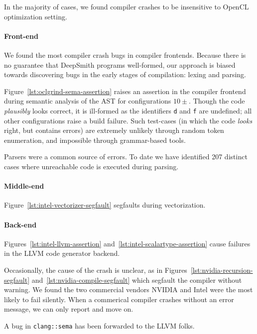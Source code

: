 In the majority of cases, we found compiler crashes to be insensitive to OpenCL optimization setting.

\paragraph{Front-end} We found the most compiler crash bugs in compiler frontends. Because there is no guarantee that DeepSmith programs well-formed, our approach is biased towards discovering bugs in the early stages of compilation: lexing and parsing.

Figure~\ref{lst:oclgrind-sema-assertion} raises an assertion in the compiler frontend during semantic analysis of the AST for configurations $10\pm$. Though the code \emph{plausibly} looks correct, it is ill-formed as the identifiers \texttt{d} and \texttt{f} are undefined; all other configurations raise a build failure. Such test-cases (in which the code \emph{looks} right, but contains errors) are extremely unlikely through random token enumeration, and impossible through grammar-based tools.

Parsers were a common source of errors. To date we have identified 207 distinct cases where unreachable code is executed during parsing.

\paragraph{Middle-end} Figure~\ref{lst:intel-vectorizer-segfault} segfaults during vectorization.

\paragraph{Back-end} Figures~\ref{lst:intel-llvm-assertion} and~\ref{lst:intel-scalartype-assertion} cause failures in the LLVM code generator backend.

Occasionally, the cause of the crash is unclear, as in Figures~\ref{lst:nvidia-recursion-segfault} and~\ref{lst:nvidia-compile-segfault} which segfault the compiler without warning. We found the two commercial vendors NVIDIA and Intel were the most likely to fail silently. When a commerical compiler crashes without an error message, we can only report and move on.

A bug in \texttt{clang::sema} has been forwarded to the LLVM folks.



